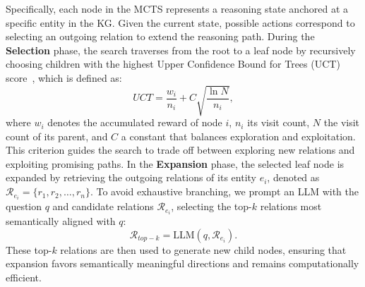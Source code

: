 Specifically, each node in the MCTS represents a reasoning state anchored at a specific entity in the KG. Given the current state, possible actions correspond to selecting an outgoing relation to extend the reasoning path. During the \textbf{Selection} phase, the search traverses from the root to a leaf node by recursively choosing children with the highest Upper Confidence Bound for Trees (UCT) score~\citep{kocsis2006bandit}, which is defined as:
\begin{equation}
\label{selection}
UCT = \frac{w_i}{n_i} + C \sqrt{\frac{\ln N}{n_i}},
\end{equation}
where $w_i$ denotes the accumulated reward of node $i$, $n_i$ its visit count, $N$ the visit count of its parent, and $C$ a constant that balances exploration and exploitation. This criterion guides the search to trade off between exploring new relations and exploiting promising paths.
In the \textbf{Expansion} phase, the selected leaf node is expanded by retrieving the outgoing relations of its entity $e_i$, denoted as $\mathcal{R}_{e_i} = \{r_1, r_2, \dots, r_n\}$. To avoid exhaustive branching, we prompt an LLM with the question $q$ and candidate relations $\mathcal{R}_{e_i}$, selecting the top-$k$ relations most semantically aligned with $q$:
\begin{equation}
\mathcal{R}_{top-k} = \text{LLM}(q, \mathcal{R}_{e_i}).
\end{equation}
These top-$k$ relations are then used to generate new child nodes, ensuring that expansion favors semantically meaningful directions and remains computationally efficient.


